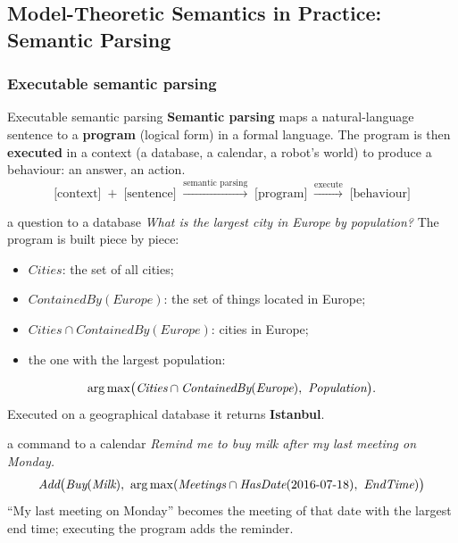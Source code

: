 \subsection{Model-Theoretic Semantics in Practice: Semantic Parsing}
\label{sec:semantic-parsing}

\subsubsection{Executable semantic parsing}

\begin{nbdef}{Executable semantic parsing}
\textbf{Semantic parsing} maps a natural-language sentence to a \textbf{program}
(logical form) in a formal language. The program is then \textbf{executed} in a
context (a database, a calendar, a robot's world) to produce a behaviour: an answer, an
action.
\[
  \text{[context]} \;+\; \text{[sentence]}
  \;\xrightarrow{\text{semantic parsing}}\; \text{[program]}
  \;\xrightarrow{\text{execute}}\; \text{[behaviour]}
\]
\end{nbdef}

\begin{nbexample}{a question to a database}
\emph{What is the largest city in Europe by population?} The program is built piece by
piece:
\begin{itemize}[nosep]
  \item $\textit{Cities}$: the set of all cities;
  \item $\textit{ContainedBy}(\textit{Europe})$: the set of things located in Europe;
  \item $\textit{Cities} \cap \textit{ContainedBy}(\textit{Europe})$: cities in Europe;
  \item the one with the largest population:
\end{itemize}
\[
  \argmax\bigl(\textit{Cities} \cap \textit{ContainedBy}(\textit{Europe}),\ \textit{Population}\bigr).
\]
Executed on a geographical database it returns \textbf{Istanbul}.
\end{nbexample}

\begin{nbexample}{a command to a calendar}
\emph{Remind me to buy milk after my last meeting on Monday.}
\[
  \textit{Add}\bigl(\textit{Buy}(\textit{Milk}),\ \argmax(\textit{Meetings} \cap
  \textit{HasDate}(\text{2016-07-18}),\ \textit{EndTime})\bigr)
\]
``My last meeting on Monday'' becomes the meeting of that date with the largest end
time; executing the program adds the reminder.
\end{nbexample}


